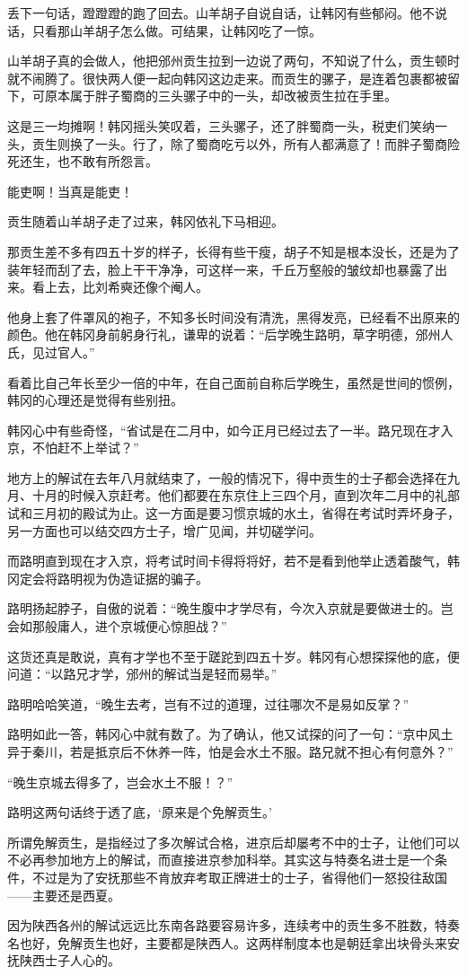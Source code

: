 丢下一句话，蹬蹬蹬的跑了回去。山羊胡子自说自话，让韩冈有些郁闷。他不说话，只看那山羊胡子怎么做。可结果，让韩冈吃了一惊。

山羊胡子真的会做人，他把邠州贡生拉到一边说了两句，不知说了什么，贡生顿时就不闹腾了。很快两人便一起向韩冈这边走来。而贡生的骡子，是连着包裹都被留下，可原本属于胖子蜀商的三头骡子中的一头，却改被贡生拉在手里。

这是三一均摊啊！韩冈摇头笑叹着，三头骡子，还了胖蜀商一头，税吏们笑纳一头，贡生则换了一头。行了，除了蜀商吃亏以外，所有人都满意了！而胖子蜀商险死还生，也不敢有所怨言。

能吏啊！当真是能吏！

贡生随着山羊胡子走了过来，韩冈依礼下马相迎。

那贡生差不多有四五十岁的样子，长得有些干瘦，胡子不知是根本没长，还是为了装年轻而刮了去，脸上干干净净，可这样一来，千丘万壑般的皱纹却也暴露了出来。看上去，比刘希奭还像个阉人。

他身上套了件罩风的袍子，不知多长时间没有清洗，黑得发亮，已经看不出原来的颜色。他在韩冈身前躬身行礼，谦卑的说着：“后学晚生路明，草字明德，邠州人氏，见过官人。”

看着比自己年长至少一倍的中年，在自己面前自称后学晚生，虽然是世间的惯例，韩冈的心理还是觉得有些别扭。

韩冈心中有些奇怪，“省试是在二月中，如今正月已经过去了一半。路兄现在才入京，不怕赶不上举试？”

地方上的解试在去年八月就结束了，一般的情况下，得中贡生的士子都会选择在九月、十月的时候入京赶考。他们都要在东京住上三四个月，直到次年二月中的礼部试和三月初的殿试为止。这一方面是要习惯京城的水土，省得在考试时弄坏身子，另一方面也可以结交四方士子，增广见闻，并切磋学问。

而路明直到现在才入京，将考试时间卡得将将好，若不是看到他举止透着酸气，韩冈定会将路明视为伪造证据的骗子。

路明扬起脖子，自傲的说着：“晚生腹中才学尽有，今次入京就是要做进士的。岂会如那般庸人，进个京城便心惊胆战？”

这货还真是敢说，真有才学也不至于蹉跎到四五十岁。韩冈有心想探探他的底，便问道：“以路兄才学，邠州的解试当是轻而易举。”

路明哈哈笑道，“晚生去考，岂有不过的道理，过往哪次不是易如反掌？”

路明如此一答，韩冈心中就有数了。为了确认，他又试探的问了一句：“京中风土异于秦川，若是抵京后不休养一阵，怕是会水土不服。路兄就不担心有何意外？”

“晚生京城去得多了，岂会水土不服！？”

路明这两句话终于透了底，‘原来是个免解贡生。’

所谓免解贡生，是指经过了多次解试合格，进京后却屡考不中的士子，让他们可以不必再参加地方上的解试，而直接进京参加科举。其实这与特奏名进士是一个条件，不过是为了安抚那些不肯放弃考取正牌进士的士子，省得他们一怒投往敌国——主要还是西夏。

因为陕西各州的解试远远比东南各路要容易许多，连续考中的贡生多不胜数，特奏名也好，免解贡生也好，主要都是陕西人。这两样制度本也是朝廷拿出块骨头来安抚陕西士子人心的。

